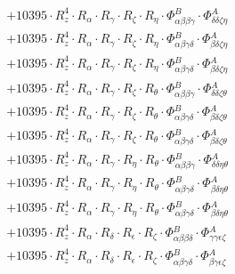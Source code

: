 \documentclass{article}
\begin{document}
\begin{subequations}
\begin{gather}
\begin{array}{c}
 \\[0.2em] 		 + 10395 \cdot R_{z}^{4} \cdot R_{\alpha{}} \cdot R_{\gamma{}} \cdot R_{\zeta{}} \cdot R_{\eta{}} \cdot \Phi{}^{B}_{\alpha{}\beta{}\beta{}\gamma{}} \cdot \Phi{}^{A}_{\delta{}\delta{}\zeta{}\eta{}} 
 \\[0.2em] 		 + 10395 \cdot R_{z}^{4} \cdot R_{\alpha{}} \cdot R_{\gamma{}} \cdot R_{\zeta{}} \cdot R_{\eta{}} \cdot \Phi{}^{B}_{\alpha{}\beta{}\gamma{}\delta{}} \cdot \Phi{}^{A}_{\beta{}\delta{}\zeta{}\eta{}} 
 \\[0.2em] 		 + 10395 \cdot R_{z}^{4} \cdot R_{\alpha{}} \cdot R_{\gamma{}} \cdot R_{\zeta{}} \cdot R_{\eta{}} \cdot \Phi{}^{B}_{\alpha{}\beta{}\gamma{}\delta{}} \cdot \Phi{}^{A}_{\beta{}\delta{}\zeta{}\eta{}} 
 \\[0.2em] 		 + 10395 \cdot R_{z}^{4} \cdot R_{\alpha{}} \cdot R_{\gamma{}} \cdot R_{\zeta{}} \cdot R_{\theta{}} \cdot \Phi{}^{B}_{\alpha{}\beta{}\beta{}\gamma{}} \cdot \Phi{}^{A}_{\delta{}\delta{}\zeta{}\theta{}} 
 \\[0.2em] 		 + 10395 \cdot R_{z}^{4} \cdot R_{\alpha{}} \cdot R_{\gamma{}} \cdot R_{\zeta{}} \cdot R_{\theta{}} \cdot \Phi{}^{B}_{\alpha{}\beta{}\gamma{}\delta{}} \cdot \Phi{}^{A}_{\beta{}\delta{}\zeta{}\theta{}} 
 \\[0.2em] 		 + 10395 \cdot R_{z}^{4} \cdot R_{\alpha{}} \cdot R_{\gamma{}} \cdot R_{\zeta{}} \cdot R_{\theta{}} \cdot \Phi{}^{B}_{\alpha{}\beta{}\gamma{}\delta{}} \cdot \Phi{}^{A}_{\beta{}\delta{}\zeta{}\theta{}} 
 \\[0.2em] 		 + 10395 \cdot R_{z}^{4} \cdot R_{\alpha{}} \cdot R_{\gamma{}} \cdot R_{\eta{}} \cdot R_{\theta{}} \cdot \Phi{}^{B}_{\alpha{}\beta{}\beta{}\gamma{}} \cdot \Phi{}^{A}_{\delta{}\delta{}\eta{}\theta{}} 
 \\[0.2em] 		 + 10395 \cdot R_{z}^{4} \cdot R_{\alpha{}} \cdot R_{\gamma{}} \cdot R_{\eta{}} \cdot R_{\theta{}} \cdot \Phi{}^{B}_{\alpha{}\beta{}\gamma{}\delta{}} \cdot \Phi{}^{A}_{\beta{}\delta{}\eta{}\theta{}} 
 \\[0.2em] 		 + 10395 \cdot R_{z}^{4} \cdot R_{\alpha{}} \cdot R_{\gamma{}} \cdot R_{\eta{}} \cdot R_{\theta{}} \cdot \Phi{}^{B}_{\alpha{}\beta{}\gamma{}\delta{}} \cdot \Phi{}^{A}_{\beta{}\delta{}\eta{}\theta{}} 
 \\[0.2em] 		 + 10395 \cdot R_{z}^{4} \cdot R_{\alpha{}} \cdot R_{\delta{}} \cdot R_{\epsilon{}} \cdot R_{\zeta{}} \cdot \Phi{}^{B}_{\alpha{}\beta{}\beta{}\delta{}} \cdot \Phi{}^{A}_{\gamma{}\gamma{}\epsilon{}\zeta{}} 
 \\[0.2em] 		 + 10395 \cdot R_{z}^{4} \cdot R_{\alpha{}} \cdot R_{\delta{}} \cdot R_{\epsilon{}} \cdot R_{\zeta{}} \cdot \Phi{}^{B}_{\alpha{}\beta{}\gamma{}\delta{}} \cdot \Phi{}^{A}_{\beta{}\gamma{}\epsilon{}\zeta{}} 

\end{array}
\end{gather}
\end{subequations}
\end{document}
